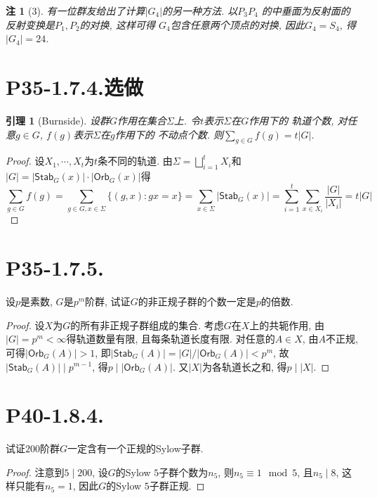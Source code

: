 \documentclass[12pt, a4paper, fontset=windows]{ctexart}
\newcommand{\Orb}{\mathsf{Orb}}
\newcommand{\Stab}{\mathsf{Stab}}
\newcommand{\abs}[1]{\left|{#1}\right|}
\newcommand{\xuan}{{\normalsize 选做}}
\newtheorem*{lemma}{引理}
\newtheorem*{remark}{注}
\begin{document}
\begin{remark}[3]
有一位群友给出了计算$\abs{G_4}$的另一种方法. 以$P_3P_4$
的中垂面为反射面的反射变换是$P_1,P_2$的对换, 这样可得
$G_4$包含任意两个顶点的对换, 因此$G_4=S_4$, 得$\abs{G_4}=24$. 
\end{remark}

\section*{P35-1.7.4.\xuan}

\begin{lemma}[Burnside]
设群$G$作用在集合$\Sigma$上. 令$t$表示$\Sigma$在$G$作用下的
轨道个数, 对任意$g\in G$, $f(g)$表示$\Sigma$在$g$作用下的
不动点个数. 则$\sum_{g\in G}f(g)=t\abs{G}$. 
\end{lemma}

\begin{proof}
设$X_1,\cdots,X_t$为$t$条不同的轨道. 
由$\Sigma=\bigsqcup^t_{i=1}X_i$和
$\abs{G}=\abs{\Stab_{G}(x)}\cdot\abs{\Orb_{G}(x)}$得
\[\sum_{g\in G}f(g)
=\sum_{g\in G,x\in\Sigma}\{(g,x):gx=x\}
=\sum_{x\in\Sigma}\abs{\Stab_{G}(x)}
=\sum^t_{i=1}\sum_{x\in X_i}\frac{\abs{G}}{\abs{X_i}}
=t\abs{G}\]
\end{proof}

\section*{P35-1.7.5.}

设$p$是素数, $G$是$p^m$阶群, 试证$G$的非正规子群的个数一定是$p$的倍数. 

\begin{proof}
设$X$为$G$的所有非正规子群组成的集合. 考虑$G$在$X$上的共轭作用, 
由$\abs{G}=p^m<\infty$得轨道数量有限, 且每条轨道长度有限. 
对任意的$A\in X$, 由$A$不正规, 可得$\abs{\Orb_{G}(A)}>1$, 
即$\abs{\Stab_{G}(A)}=\abs{G}/\abs{\Orb_{G}(A)}<p^m$, 
故$\abs{\Stab_{G}(A)}\mid p^{m-1}$, 得$p\mid\abs{\Orb_{G}(A)}$. 
又$\abs{X}$为各轨道长之和, 得$p\mid\abs{X}$. 
\end{proof}

\section*{P40-1.8.4.}

试证$200$阶群$G$一定含有一个正规的Sylow子群. 

\begin{proof}
注意到$5\mid 200$, 设$G$的Sylow $5$子群个数为$n_5$, 
则$n_5\equiv 1\mod{5}$, 且$n_5\mid 8$, 这样只能有$n_5=1$, 
因此$G$的Sylow $5$子群正规. 
\end{proof}
\end{document}
